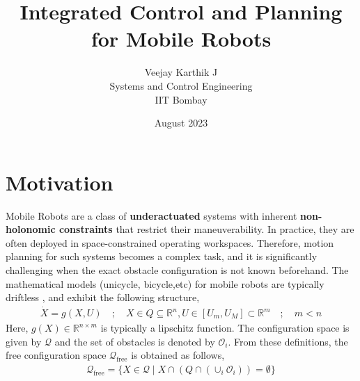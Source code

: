 \documentclass{article}
\begin{document}
\title{Integrated Control and Planning for Mobile Robots}
\author{Veejay Karthik J\\
Systems and Control Engineering\\
IIT Bombay}
\date{August 2023}


\maketitle

\section{Motivation}

Mobile Robots are a class of \textbf{underactuated} systems with inherent \textbf{non-holonomic constraints} that restrict their maneuverability. In practice, they are often deployed in space-constrained operating workspaces. Therefore, motion planning for such systems becomes a complex task, and it is significantly challenging when the exact obstacle configuration is not known beforehand. The mathematical models (unicycle, bicycle,etc) for mobile robots are typically driftless , and exhibit the following structure,
\begin{align}
\label{eqn:SystemDescription}
\dot{X} = g(X,U) \quad;\quad X \in Q \subseteq \mathbb{R}^n, U\in [U_m,U_M]\subset\mathbb{R}^m \quad;\quad m < n
\end{align}
Here, $g(X)\in \mathbb{R}^{n\times m}$ is typically a lipschitz function. The configuration space is given by $\mathcal{Q}$ and the set of obstacles is denoted by $\mathcal{O}_i$. From these definitions, the free configuration space $\mathcal{Q}_{\text{free}}$ is obtained as follows,
\begin{align}
    \label{eqn:FreeWorkspaces}
    \mathcal{Q}_{\text{free}} = \{X\in\mathcal{Q}\;|\; X\cap\left(Q\cap (\cup_i \mathcal{O}_i)\right) = \emptyset \}
\end{align}
\end{document}
